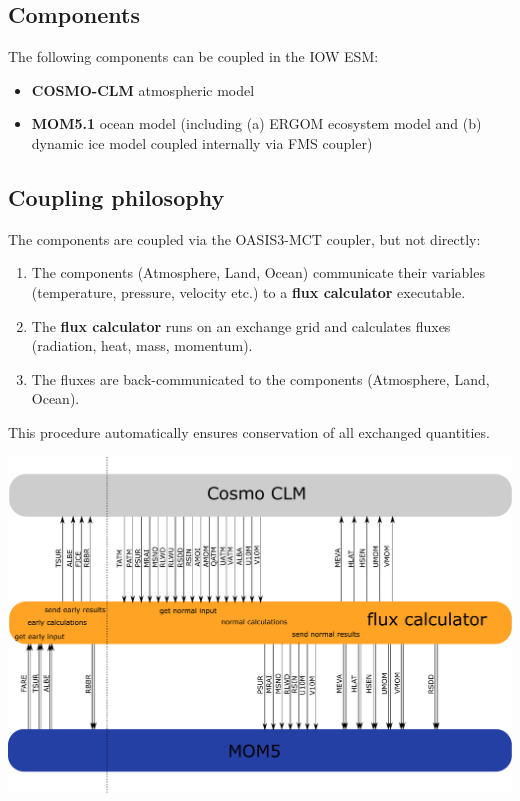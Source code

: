 \documentclass[a4paper,titlepage]{scrartcl}
\begin{document}
\subsection{Components}
The following components can be coupled in the IOW ESM:
\begin{itemize}
\item \textbf{COSMO-CLM} atmospheric model
\item \textbf{MOM5.1} ocean model (including (a) ERGOM ecosystem model and (b) dynamic ice model coupled internally via FMS coupler)
\end{itemize}

\subsection{Coupling philosophy}
The components are coupled via the OASIS3-MCT coupler, but not directly:
\begin{enumerate}
\item The components (Atmosphere, Land, Ocean) communicate their variables (temperature, pressure, velocity etc.) to a \textbf{flux calculator} executable.
\item The \textbf{flux calculator} runs on an exchange grid and calculates  fluxes (radiation, heat, mass, momentum).
\item The fluxes are back-communicated to the components (Atmosphere, Land, Ocean).
\end{enumerate}
This procedure automatically ensures conservation of all exchanged quantities.

\begin{center}
\includegraphics[scale=0.3]{./figures/sequence-diagram.pdf}
\end{center}
\end{document}
